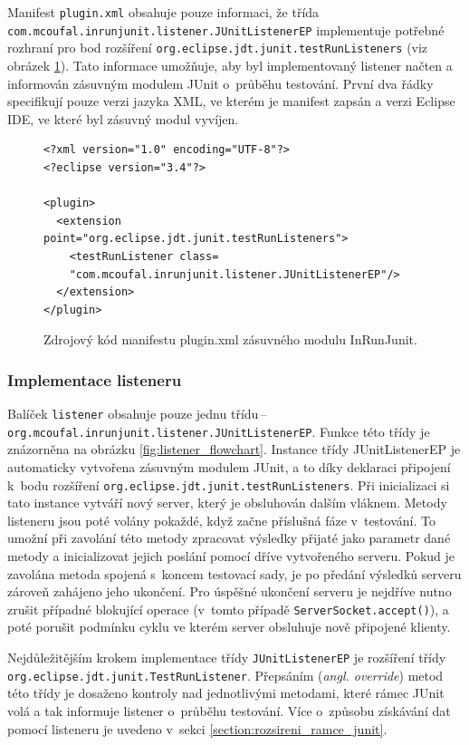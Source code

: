 	Manifest \texttt{plugin.xml} obsahuje pouze informaci, že třída \texttt{com.\-mcoufal.\-inrunjunit.\-listener.\-JUnitListenerEP} implementuje potřebné rozhraní pro bod rozšíření \texttt{org.\-eclipse.\-jdt.\-junit.\-testRunListeners} (viz obrázek \ref{code:plugin.xml}). Tato informace umožňuje, aby byl implementovaný listener načten a informován zásuvným modulem JUnit o~průběhu testování. První dva řádky specifikují pouze verzi jazyka XML, ve kterém je manifest zapsán a verzi Eclipse IDE, ve které byl zásuvný modul vyvíjen.  

	\lstset{language=xml}
	\begin{figure}
	  \begin{lstlisting}[frame=single]
<?xml version="1.0" encoding="UTF-8"?>
<?eclipse version="3.4"?>

<plugin>
  <extension point="org.eclipse.jdt.junit.testRunListeners">
    <testRunListener class=
    "com.mcoufal.inrunjunit.listener.JUnitListenerEP"/>
  </extension>
</plugin>
	  \end{lstlisting}
	  \caption{Zdrojový kód manifestu plugin.xml zásuvného modulu InRunJunit.}
	  \label{code:plugin.xml}
	\end{figure}

      \subsubsection{Implementace listeneru}
	Balíček \texttt{listener} obsahuje pouze jednu třídu\,--\,\texttt{org.\-mcoufal.\-inrunjunit.\-listener.\-JUnitListenerEP}. Funkce této třídy je znázorněna na obrázku \ref{fig:listener_flowchart}. Instance třídy JUnitListenerEP je automaticky vytvořena zásuvným modulem JUnit, a to díky deklaraci připojení k~bodu rozšíření \texttt{org.\-eclipse.\-jdt.\-junit.\-testRunListeners}. Při inicializaci si tato instance vytváří nový server, který je obsluhován dalším vláknem. Metody listeneru jsou poté volány pokaždé, když začne příslušná fáze v~testování. To umožní při zavolání této metody zpracovat výsledky přijaté jako parametr dané metody a inicializovat jejich poslání pomocí dříve vytvořeného serveru. Pokud je zavolána metoda spojená s~koncem testovací sady, je po předání výsledků serveru zároveň zahájeno jeho ukončení. Pro úspěšné ukončení serveru je nejdříve nutno zrušit případné blokující operace (v~tomto případě \texttt{ServerSocket.accept()}), a poté porušit podmínku cyklu ve kterém server obsluhuje nově připojené klienty.
	
	Nejdůležitějším krokem implementace třídy \texttt{JUnitListenerEP} je rozšíření třídy \texttt{org.\-eclipse.\-jdt.\-junit.\-TestRunListener}. Přepsáním (\emph{angl. override}) metod této třídy je dosaženo kontroly nad jednotlivými metodami, které rámec JUnit volá a tak informuje listener o~průběhu testování. Více o~způsobu získávání dat pomocí listeneru je uvedeno v~sekci \ref{section:rozsireni_ramce_junit}.
	
